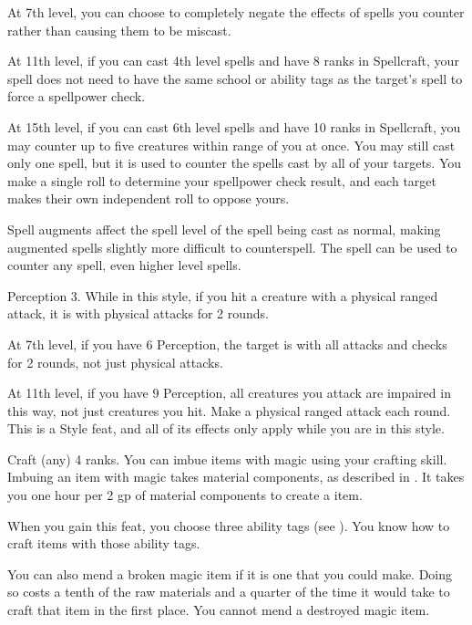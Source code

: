     At 7th level, you can choose to completely negate the effects of spells you counter rather than causing them to be miscast.

    At 11th level, if you can cast 4th level spells and have 8 ranks in Spellcraft, your spell does not need to have the same school or ability tags as the target's spell to force a spellpower check.

    At 15th level, if you can cast 6th level spells and have 10 ranks in Spellcraft, you may counter up to five creatures within \rngmed range of you at once.
    You may still cast only one spell, but it is used to counter the spells cast by all of your targets.
    You make a single roll to determine your spellpower check result, and each target makes their own independent roll to oppose yours.

    Spell augments affect the spell level of the spell being cast as normal, making augmented spells slightly more difficult to counterspell.
    The  spell can be used to counter any spell, even higher level spells.

    \featpres Perception 3.
    \featben While in this style, if you hit a creature with a physical ranged attack, it is \impaired with physical attacks for 2 rounds.

    At 7th level, if you have 6 Perception, the target is \impaired with all attacks and checks for 2 rounds, not just physical attacks.

    At 11th level, if you have 9 Perception, all creatures you attack are impaired in this way, not just creatures you hit.
    \stylereq Make a physical ranged attack each round.
     This is a Style feat, and all of its effects only apply while you are in this style.

    \featpre Craft (any) 4 ranks.
    \featben You can imbue items with magic using your crafting skill.
    Imbuing an item with magic takes material components, as described in .
    It takes you one hour per 2 gp of material components to create a item.

    When you gain this feat, you choose three ability tags (see ).
    You know how to craft items with those ability tags.

    You can also mend a broken magic item if it is one that you could make.
    Doing so costs a tenth of the raw materials and a quarter of the time it would take to craft that item in the first place.
    You cannot mend a destroyed magic item.

